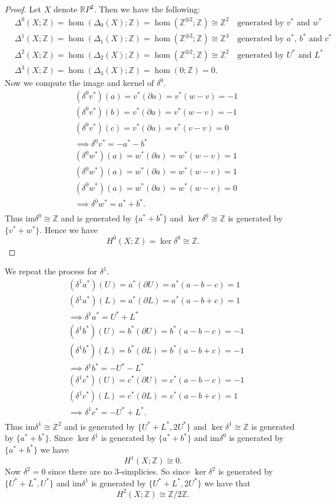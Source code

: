 \documentclass[leqno]{article}
\theoremstyle{nonumberplain}
\newtheorem{proof}{Proof}
\newcommand{\im}{\mathrm{im}}
\newcommand{\R}{\mathbb{R}}
\newcommand{\Z}{\mathbb{Z}}
\begin{document}
\begin{proof}
Let $X$ denote $\R P^2$.  Then we have the following:
\begin{align*}
&\Delta^0(X;\Z) = \hom (\Delta_0 (X);\Z) = \hom(\Z^{\oplus 2};\Z) \cong \Z^2 \quad \textrm{generated by $v^*$ and $w^*$}\\
&\Delta^1(X;\Z) = \hom (\Delta_1 (X);\Z) = \hom(\Z^{\oplus 3};\Z) \cong \Z^3 \quad \textrm{generated by $a^*$, $b^*$ and $c^*$}\\
&\Delta^2(X;\Z) = \hom (\Delta_2 (X);\Z) = \hom(\Z^{\oplus 2};\Z) \cong \Z^2 \quad \textrm{generated by $U^*$ and $L^*$}\\
&\Delta^3(X;\Z) = \hom (\Delta_3 (X);\Z) = \hom(0;\Z)=0.
\end{align*}
Now we compute the image and kernel of $\delta^0$.
\begin{align*}
&(\delta^0 v^*)(a)=v^*(\partial a)=v^*(w-v)=-1\\
&(\delta^0 v^*)(b)=v^*(\partial a)=v^*(w-v)=-1\\
&(\delta^0 v^*)(c)=v^*(\partial a)=v^*(v-v)=0\\
& \implies \delta^0 v^* = -a^*-b^*\\
&(\delta^0 w^*)(a)=w^*(\partial a)=w^*(w-v)=1\\
&(\delta^0 w^*)(a)=w^*(\partial a)=w^*(w-v)=1\\
&(\delta^0 w^*)(a)=w^*(\partial a)=w^*(w-v)=0\\
& \implies \delta^0 w^* = a^*+b^*.\\
\end{align*}
Thus $\im \delta^0 \cong \Z$ and is generated by $\{a^*+b^*\}$ and $\ker\delta^0 \cong \Z$ is generated by $\{v^*+w^*\}$. Hence we have
\[
H^0(X;\Z)=\ker \delta^0 \cong \Z.
\]
\end{proof}
We repeat the process for $\delta^1$.
\begin{align*}
&(\delta^1 a^*)(U)=a^*(\partial U)=a^*(a-b-c)=1\\
&(\delta^1 a^*)(L)=a^*(\partial L)=a^*(a-b+c)=1\\
& \implies \delta^1 a^* = U^*+L^*\\
&(\delta^1 b^*)(U)=b^*(\partial U)=b^*(a-b-c)=-1\\
&(\delta^1 b^*)(L)=b^*(\partial L)=b^*(a-b+c)=-1\\
& \implies \delta^1 b^* = -U^*-L^*\\
&(\delta^1 c^*)(U)=c^*(\partial U)=c^*(a-b-c)=-1\\
&(\delta^1 c^*)(L)=c^*(\partial L)=c^*(a-b+c)=1\\
& \implies \delta^1 c^* = -U^*+L^*.\\
\end{align*}
Thus $\im \delta^1 \cong \Z^2$ and is generated by $\{U^*+L^*,2U^*\}$ and $\ker\delta^1 \cong \Z$ is generated by $\{a^*+b^*\}$. Since $\ker \delta^1$ is generated by $\{a^*+b^*\}$ and $\im \delta^0$ is generated by $\{a^*+b^*\}$ we have
\[
H^1(X;\Z)\cong 0.
\]
Now $\delta^2 =0$ since there are no $3$-simplicies. So since $\ker \delta^2$ is generated by $\{U^*+L^*,U^*\}$ and $\im \delta^1$ is generated by $\{U^*+L^*,2U^*\}$ we have that
\[
H^2(X;\Z)\cong \Z/2\Z.
\]
\end{document}
